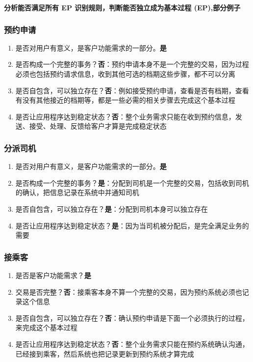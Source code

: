 \documentclass{book}        %
\providecommand{\tightlist}{%
  \setlength{\itemsep}{0pt}\setlength{\parskip}{0pt}}
\begin{document}
\textbf{分析能否满足所有 EP 识别规则，判断能否独立成为基本过程
(EP),部分例子}

\hypertarget{ux9884ux7ea6ux7533ux8bf7}{%
\subsubsection{预约申请}\label{ux9884ux7ea6ux7533ux8bf7}}

\begin{enumerate}
\tightlist
\item
  是否对用户有意义，是客户功能需求的一部分。\textbf{是}
\item
  是否构成一个完整的事务？\textbf{否}：预约申请本身不是一个完整的交易，因为过程必须也包括预约请求信息，收到其他可选的档期这些步骤，都不可以分离
\item
  是否自包含，可以独立存在？\textbf{否}：例如接受预约申请，查看是否有档期，查看有没有其他接近的档期等，都是一些必需的相关步骤去完成这个基本过程
\item
  是否让应用程序达到稳定状态？\textbf{否}：整个业务需求只能在收到预约信息，发送、接受、处理、反馈给客户才算是完成稳定状态
\end{enumerate}

\hypertarget{ux5206ux6d3eux53f8ux673a}{%
\subsubsection{分派司机}\label{ux5206ux6d3eux53f8ux673a}}

\begin{enumerate}
\tightlist
\item
  是否对用户有意义，是客户功能需求的一部分。\textbf{是}
\item
  是否构成一个完整的事务？\textbf{是}：分配到司机是一个完整的交易，包括收到司机的确认，把信息记录在系统中并通知司机
\item
  是否自包含，可以独立存在？\textbf{是}：分配到司机本身可以独立存在
\item
  是否让应用程序达到稳定状态？\textbf{是}：因为当司机被分配后，是完全满足业务的需要
\end{enumerate}

\hypertarget{ux63a5ux4e58ux5ba2}{%
\subsubsection{接乘客}\label{ux63a5ux4e58ux5ba2}}

\begin{enumerate}
\tightlist
\item
  是否是客户功能需求？\textbf{是}
\item
  交易是否完整？\textbf{否}：接乘客本身不算一个完整的交易，因为预约系统必须也记录这个信息
\item
  是否自包含，可以独立存在？\textbf{否}：确认预约申请是下面一个必须执行的过程，来完成这个基本过程
\item
  是否让应用程序达到稳定状态？\textbf{否}：整个业务需求只能在预约系统确认沟通，已经接到乘客，然后系统也把记录更新到预约系统才算完成
\end{enumerate}
\end{document}
